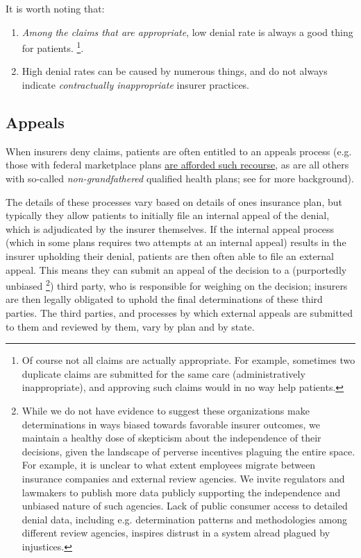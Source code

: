 \documentclass[12pt, a4paper,twoside,parskip=full]{report}
\theoremstyle{plain} %
\theoremstyle{definition} %
\theoremstyle{remark} %
\numberwithin{equation}{chapter}
\begin{document}
		It is worth noting that:
		
		\begin{enumerate}
			\item \emph{Among the claims that are appropriate}, low denial rate is always a good thing for patients. \footnote{Of course not all claims are actually appropriate. For example, sometimes two duplicate claims are submitted for the same care (administratively inappropriate), and approving such claims would in no way help patients. }.
			\item High denial rates can be caused by numerous things, and do not always indicate \emph{contractually inappropriate} insurer practices.
		\end{enumerate}
		
		
		\subsection{Appeals}
		
		When insurers deny claims, patients are often entitled to an appeals process (e.g. those with federal marketplace plans \href{https://www.healthcare.gov/appeal-insurance-company-decision/appeals/}{are afforded such recourse}, as are all others with so-called \emph{non-grandfathered} qualified health plans; see \cite{pollitz2021} for more background).
		
		The details of these processes vary based on details of ones insurance plan, but typically they allow patients to initially file an internal appeal of the denial, which is adjudicated by the insurer themselves. If the internal appeal process (which in some plans requires two attempts at an internal appeal) results in the insurer upholding their denial, patients are then often able to file an external appeal. This means they can submit an appeal of the decision to a (purportedly unbiased \footnote{While we do not have evidence to suggest these organizations make determinations in ways biased towards favorable insurer outcomes, we maintain a healthy dose of skepticism about the independence of their decisions, given the landscape of perverse incentives plaguing the entire space. For example, it is unclear to what extent employees migrate between insurance companies and external review agencies. We invite regulators and lawmakers to publish more data publicly supporting the independence and unbiased nature of such agencies. Lack of public consumer access to detailed denial data, including e.g. determination patterns and methodologies among different review agencies, inspires distrust in a system alread plagued by injustices.}) third party, who is responsible for weighing on the decision; insurers are then legally obligated to uphold the final determinations of these third parties. The third parties, and processes by which external appeals are submitted to them and reviewed by them, vary by plan and by state.
		
\end{document}
